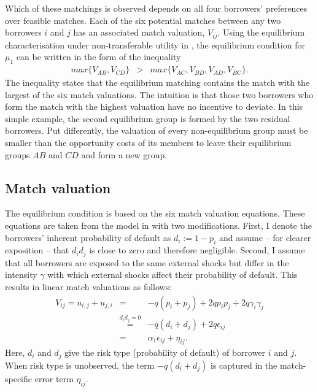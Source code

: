 Which of these matchings is observed depends on all four borrowers' preferences over feasible matches. Each of the six potential matches between any two borrowers $i$ and $j$ has an associated match valuation, $V_{ij}$. %
Using the equilibrium characterisation under non-transferable utility in \citet{Klein2015a}, the equilibrium condition for $\mu_1$ can be written in the form of the inequality
\begin{eqnarray} \label{Eqn:IntroExampleEquilibriumCondition}
max\{ V_{AB}, V_{CD} \} &>& max\{ V_{AC}, V_{BD}, V_{AD}, V_{BC} \}.
\end{eqnarray} 
The inequality states that the equilibrium matching contains the match with the largest of the six match valuations. The intuition is that those two borrowers who form the match with the highest valuation have no incentive to deviate. In this simple example, the second equilibrium group is formed by the two residual borrowers. Put differently, the valuation of every non-equilibrium group must be smaller than the opportunity costs of its members to leave their equilibrium groups $AB$ and $CD$ and form a new group.



\subsection{Match valuation}

The equilibrium condition is based on the six match valuation equations. These equations are taken from the model in \citet{Ghatak1999} with %
two modifications. First, I denote the borrowers' inherent probability of default as $d_i:=1-p_i$ and assume -- for clearer exposition -- that $d_id_j$ is close to zero and therefore negligible. Second, I assume that all borrowers are exposed to the same external shocks but differ in the intensity $\gamma$ with which external shocks affect their probability of default. 
This results in linear match valuations as follows:
\begin{eqnarray}
V_{ij} = u_{i,j} + u_{j,i} &=& -q(p_i+p_j) + 2qp_ip_j + 2q\gamma_i\gamma_j \\
       &\stackrel{d_id_j=0}{=}& -q(d_i+d_j) + 2q\epsilon_{ij} \label{Eqn:ExampleSelectionEqn2}\\ 
       &=& \alpha_1 \epsilon_{ij} + \eta_{ij}. \label{Eqn:ExampleSelectionEqn}
\end{eqnarray}
Here, $d_i$ and $d_j$ give the risk type (probability of default) of borrower $i$ and $j$. 
When risk type is unobserved, the term $-q(d_i+d_j)$ is captured in the match-specific error term $\eta_{ij}$. 

